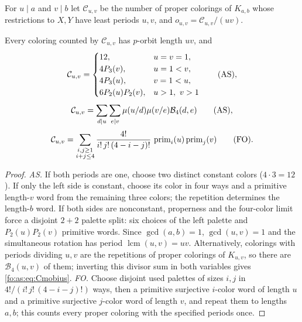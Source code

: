\documentclass[11pt,a4paper]{article}
\numberwithin{equation}{section}
\theoremstyle{definition}
\theoremstyle{remark}
\newcommand{\lcm}{\operatorname{lcm}}
\newcommand{\Bip}{\mathcal B}
\begin{document}
For $u\mid a$ and $v\mid b$ let $\mathcal C_{u,v}$ be the number of proper
colorings of $K_{a,b}$ whose restrictions to $X,Y$ have least periods $u,v$,
and $o_{u,v}=\mathcal C_{u,v}/(uv)$.

\begin{lemma}\label{fo:lem:periods}
Every coloring counted by $\mathcal C_{u,v}$ has $p$-orbit length $uv$, and
\begin{equation}\label{fo:as:eq:C}
 \mathcal C_{u,v}=
 \begin{cases}
 12,&u=v=1,\\
 4P_3(v),&u=1<v,\\
 4P_3(u),&v=1<u,\\
 6P_2(u)P_2(v),&u>1,\ v>1
 \end{cases}
 \qquad\textup{(AS)},
\end{equation}
\begin{equation}\label{fo:as:eq:Cmobius}
 \mathcal C_{u,v}=\sum_{d\mid u}\sum_{e\mid v}\mu(u/d)\mu(v/e)\Bip_4(d,e)
 \qquad\textup{(AS)},
\end{equation}
\begin{equation}\label{fo:fo:eq:Cpalette}
 \mathcal C_{u,v}=
 \sum_{\substack{i,j\ge1\\i+j\le4}}\frac{4!}{i!\,j!\,(4-i-j)!}\,
 \operatorname{prim}_i(u)\operatorname{prim}_j(v)
 \qquad\textup{(FO)}.
\end{equation}
\end{lemma}

\begin{proof}
\emph{AS.} If both periods are one, choose two distinct constant colors
($4\cdot3=12$). If only the left side is constant, choose its color in four
ways and a primitive length-$v$ word from the remaining three colors; the
repetition determines the length-$b$ word. If both sides are nonconstant,
properness and the four-color limit force a disjoint $2+2$ palette split: six
choices of the left palette and $P_2(u)P_2(v)$ primitive words. Since
$\gcd(a,b)=1$, $\gcd(u,v)=1$ and the simultaneous rotation has period
$\lcm(u,v)=uv$. Alternatively, colorings with periods dividing $u,v$ are the
repetitions of proper colorings of $K_{u,v}$, so there are $\Bip_4(u,v)$ of
them; inverting this divisor sum in both variables gives
\eqref{fo:as:eq:Cmobius}.
\emph{FO.} Choose disjoint used palettes of sizes $i,j$ in
$4!/(i!\,j!\,(4-i-j)!)$ ways, then a primitive surjective $i$-color word of
length $u$ and a primitive surjective $j$-color word of length $v$, and repeat
them to lengths $a,b$; this counts every proper coloring with the specified
periods once.
\end{proof}
\end{document}
